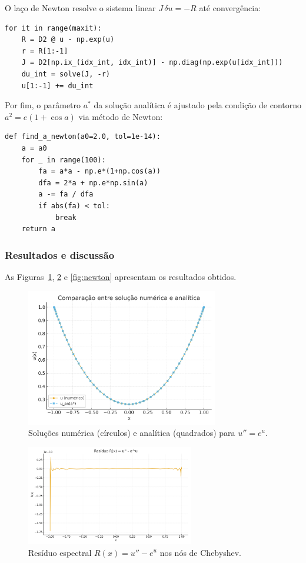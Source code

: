 \documentclass[12pt,a4paper]{article}
\begin{document}
O laço de Newton resolve o sistema linear $J\,\delta u=-R$ até convergência:

\begin{verbatim}
for it in range(maxit):
    R = D2 @ u - np.exp(u)
    r = R[1:-1]
    J = D2[np.ix_(idx_int, idx_int)] - np.diag(np.exp(u[idx_int]))
    du_int = solve(J, -r)
    u[1:-1] += du_int
\end{verbatim}

Por fim, o parâmetro $a^*$ da solução analítica é ajustado pela condição de contorno $a^2=e(1+\cos a)$ via método de Newton:

\begin{verbatim}
def find_a_newton(a0=2.0, tol=1e-14):
    a = a0
    for _ in range(100):
        fa = a*a - np.e*(1+np.cos(a))
        dfa = 2*a + np.e*np.sin(a)
        a -= fa / dfa
        if abs(fa) < tol:
            break
    return a
\end{verbatim}

\subsubsection{Resultados e discussão}
As Figuras~\ref{fig:u_solucao}, \ref{fig:residuo} e \ref{fig:newton} apresentam os resultados obtidos.

\begin{figure}[H]
    \centering
    \includegraphics[width=0.75\textwidth]{figures/u_solution_highlighted.png}
    \caption{Soluções numérica (círculos) e analítica (quadrados) para $u''=e^u$.}
    \label{fig:u_solucao}
\end{figure}

\begin{figure}[H]
    \centering
    \includegraphics[width=0.65\textwidth]{figures/residual.png}
    \caption{Resíduo espectral $R(x)=u''-e^u$ nos nós de Chebyshev.}
    \label{fig:residuo}
\end{figure}
\end{document}
